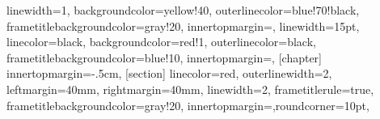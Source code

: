 \newenvironment{filter}[2]
{
\refstepcounter{filter}\par\medskip\noindent
\begin{large}
\textit{Contour filter~\thefilter} \textbf{#1}\\
\noindent \mcode{function #2}\\
\end{large}
\noindent
}
{
}


\newenvironment{colbox}[1]
{
	\def\FrameCommand{\colorbox{colboxcolor}}%
	\MakeFramed{\advance\hsize-\width \FrameRestore\cornersize{0.9}}
	\begin{scriptsize}
	\section{#1}
}
{
    \end{scriptsize}
	\endMakeFramed
}
\newenvironment{colbox2}[1]
{
	\def\FrameCommand{\colorbox{legendcol}}%
	\MakeFramed{\advance\hsize-\width \FrameRestore}
	\begin{footnotesize}
}
{
\end{footnotesize}
	\endMakeFramed
}
\newenvironment{abstract}%
{
    \cleardoublepage\thispagestyle{empty}\null\vfill\begin{center}%
    \bfseries\abstractname\end{center}
}
{
	\vfill\null
}
 {linewidth=1,
 backgroundcolor=yellow!40,
 outerlinecolor=blue!70!black,
 frametitlebackgroundcolor=gray!20,
 innertopmargin=\topskip,}
 {linewidth=15pt,
 linecolor=black,
 backgroundcolor=red!1,
 outerlinecolor=black,
 frametitlebackgroundcolor=blue!10,
 innertopmargin=\topskip,}
 [chapter]
 {%
 innertopmargin=-.5cm,}
 [section]
 {linecolor=red,
 outerlinewidth=2,
 leftmargin=40mm,
 rightmargin=40mm,
 linewidth=2,
 frametitlerule=true,
 frametitlebackgroundcolor=gray!20,
 innertopmargin=\topskip,roundcorner=10pt,}
